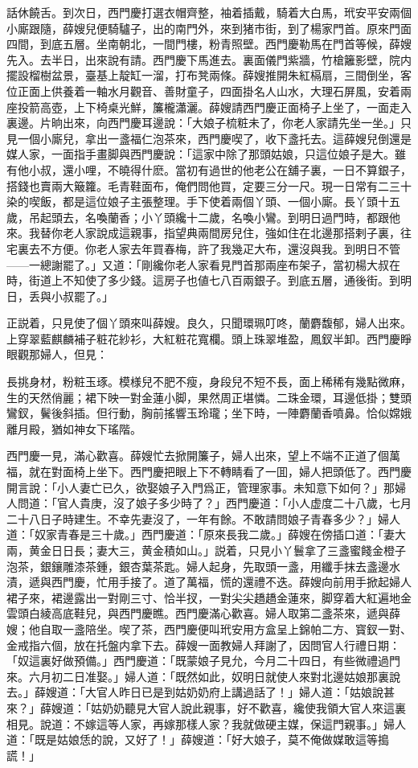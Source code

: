 話休饒舌。到次日，西門慶打選衣帽齊整，袖着插戴，騎着大白馬，玳安平安兩個小廝跟隨，薛嫂兒便騎驢子，出的南門外，來到猪市街，到了楊家門首。原來門面四間，到底五層。坐南朝北，一間門樓，粉青照壁。西門慶勒馬在門首等候，薛嫂先入。去半日，出來說有請。西門慶下馬進去。裏面儀門紫牆，竹槍籬影壁，院内擺設榴樹盆景，臺基上靛缸一溜，打布凳兩條。薛嫂推開朱紅槅扇，三間倒坐，客位正面上供養着一軸水月觀音、善財童子，四面掛名人山水，大理石屏風，安着兩座投箭高壺，上下椅桌光鮮，簾櫳瀟灑。薛嫂請西門慶正面椅子上坐了，一面走入裏邊。片晌出來，向西門慶耳邊說：「大娘子梳粧未了，你老人家請先坐一坐。」只見一個小廝兒，拿出一盞福仁泡茶來，西門慶喫了，收下盞托去。這薛嫂兒倒還是媒人家，一面指手畫脚與西門慶說：「這家中除了那頭姑娘，只這位娘子是大。雖有他小叔，還小哩，不曉得什麽。當初有過世的他老公在舖子裏，一日不算銀子，搭錢也賣兩大簸籮。毛青鞋面布，俺們問他買，定要三分一尺。現一日常有二三十染的喫飯，都是這位娘子主張整理。手下使着兩個丫頭、一個小廝。長丫頭十五歲，吊起頭去，名喚蘭香；小丫頭纔十二歲，名喚小鸞。到明日過門時，都跟他來。我替你老人家說成這親事，指望典兩間房兒住，強如住在北邊那搭剌子裏，往宅裏去不方便。你老人家去年買春梅，許了我幾疋大布，還沒與我。到明日不管——一總謝罷了。」又道：「剛纔你老人家看見門首那兩座布架子，當初楊大叔在時，街道上不知使了多少錢。這房子也値七八百兩銀子。到底五層，通後街。到明日，丢與小叔罷了。」

正説着，只見使了個丫頭來叫薛嫂。良久，只聞環珮叮咚，蘭麝馥郁，婦人出來。上穿翠藍麒麟補子粧花紗衫，大紅粧花寬欄。頭上珠翠堆盈，鳳釵半卸。西門慶睜眼觀那婦人，但見：

\begin{myquote}
長挑身材，粉粧玉琢。模様兒不肥不瘦，身段兒不短不長，面上稀稀有幾點微麻，生的天然俏麗；裙下映一對金蓮小脚，果然周正堪憐。二珠金環，耳邊低掛；雙頭鸞釵，鬢後斜插。但行動，胸前搖響玉玲瓏；坐下時，一陣麝蘭香噴鼻。恰似嫦娥離月殿，猶如神女下瑤階。
\end{myquote}

西門慶一見，滿心歡喜。薛嫂忙去掀開簾子，婦人出來，望上不端不正道了個萬福，就在對面椅上坐下。西門慶把眼上下不轉睛看了一囬，婦人把頭低了。西門慶開言說：「小人妻亡已久，欲娶娘子入門爲正，管理家事。未知意下如何？」那婦人問道：「官人貴庚，沒了娘子多少時了？」西門慶道：「小人虚度二十八歲，七月二十八日子時建生。不幸先妻沒了，一年有餘。不敢請問娘子青春多少？」婦人道：「奴家青春是三十歲。」西門慶道：「原來長我二歲。」薛嫂在傍插口道：「妻大兩，黄金日日長；妻大三，黄金積如山。」説着，只見小丫鬟拿了三盞蜜餞金橙子泡茶，銀鑲雕漆茶鍾，銀杏葉茶匙。婦人起身，先取頭一盞，用纖手抹去盞邊水漬，遞與西門慶，忙用手接了。道了萬福，慌的還禮不迭。薛嫂向前用手掀起婦人裙子來，裙邊露出一對剛三寸、恰半扠，一對尖尖趫趫金蓮來，脚穿着大紅遍地金雲頭白綾高底鞋兒，與西門慶瞧。西門慶滿心歡喜。婦人取第二盞茶來，遞與薛嫂；他自取一盞陪坐。喫了茶，西門慶便叫玳安用方盒呈上錦帕二方、寳釵一對、金戒指六個，放在托盤内拿下去。薛嫂一面教婦人拜謝了，因問官人行禮日期：「奴這裏好做預備。」西門慶道：「既蒙娘子見允，今月二十四日，有些微禮過門來。六月初二日准娶。」婦人道：「既然如此，奴明日就使人來對北邊姑娘那裏說去。」薛嫂道：「大官人昨日已是到姑奶奶府上講過話了！」婦人道：「姑娘說甚來？」薛嫂道：「姑奶奶聽見大官人說此親事，好不歡喜，纔使我領大官人來這裏相見。說道：不嫁這等人家，再嫁那樣人家？我就做硬主媒，保這門親事。」婦人道：「既是姑娘恁的說，又好了！」薛嫂道：「好大娘子，莫不俺做媒敢這等搗謊！」

